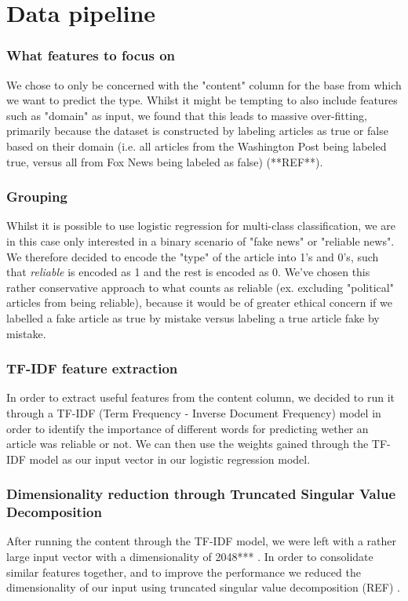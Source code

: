 \section{Data pipeline}
\subsubsection{What features to focus on}
We chose to only be concerned with the "content" column for the base from which we want to predict the type. Whilst it
might be tempting to also include features such as "domain" as input, we found that this leads to massive over-fitting,
primarily because the dataset is constructed by labeling articles as true or false based on their domain (i.e. all
articles from the Washington Post being labeled true, versus all from Fox News being labeled as false) (**REF**).
\subsubsection{Grouping}
Whilst it is possible to use logistic regression for multi-class classification, we are in this case only interested in
a binary scenario of "fake news" or "reliable news". We therefore decided to encode the "type" of the article into 1's
and 0's, such that \textit{reliable} is encoded as 1 and the rest is encoded as 0. We've chosen this rather
conservative approach to what counts as reliable (ex. excluding "political" articles from being reliable), because it
would be of greater ethical concern if we labelled a fake article as true by mistake versus labeling a true article
fake by mistake.


\subsubsection{TF-IDF feature extraction}
In order to extract useful features from the content column, we decided to run it through a TF-IDF (Term
Frequency - Inverse Document Frequency) model in order to identify the importance of different words for predicting
wether an article was reliable or not. We can then use the weights gained through the TF-IDF model as our input vector
in our logistic regression model. 

\subsubsection{Dimensionality reduction through Truncated Singular Value Decomposition}
After running the content through the TF-IDF model, we were left with a rather large input vector with a dimensionality
of 2048***
. In order to consolidate similar features together, and to improve the performance we reduced the
dimensionality of our input using truncated singular value decomposition (REF) .
